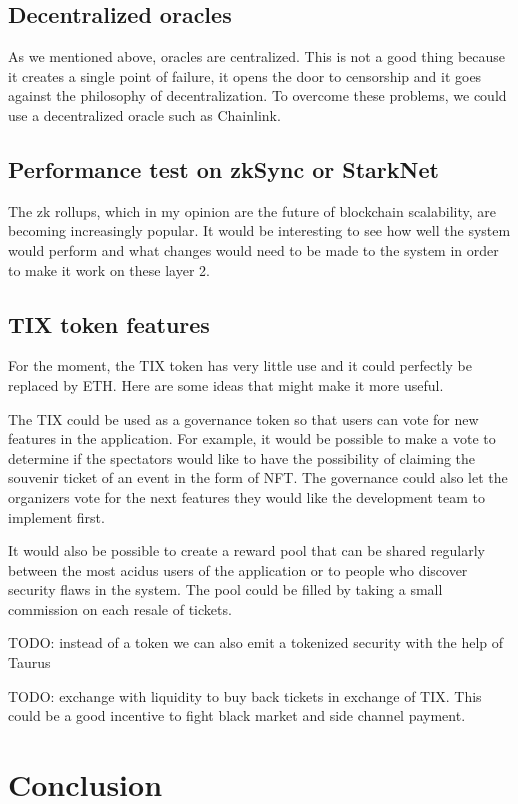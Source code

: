 \documentclass[a4paper,11pt,oneside]{report}
\begin{document}
\section{Decentralized oracles}
As we mentioned above, oracles are centralized. This is not a good thing because it creates a single point of failure, it opens the door to censorship and it goes against the philosophy of decentralization. To overcome these problems, we could use a decentralized oracle such as Chainlink.

\section{Performance test on zkSync or StarkNet}
The zk rollups, which in my opinion are the future of blockchain scalability, are becoming increasingly popular. It would be interesting to see how well the system would perform and what changes would need to be made to the system in order to make it work on these layer 2.

\section{TIX token features}
For the moment, the TIX token has very little use and it could perfectly be replaced by ETH. Here are some ideas that might make it more useful.

The TIX could be used as a governance token so that users can vote for new features in the application. For example, it would be possible to make a vote to determine if the spectators would like to have the possibility of claiming the souvenir ticket of an event in the form of NFT. The governance could also let the organizers vote for the next features they would like the development team to implement first.

It would also be possible to create a reward pool that can be shared regularly between the most acidus users of the application or to people who discover security flaws in the system. The pool could be filled by taking a small commission on each resale of tickets.

TODO: instead of a token we can also emit a tokenized security with the help of Taurus

TODO: exchange with liquidity to buy back tickets in exchange of TIX. This could be a good incentive to fight black market and side channel payment.

\chapter{Conclusion}
\end{document}
